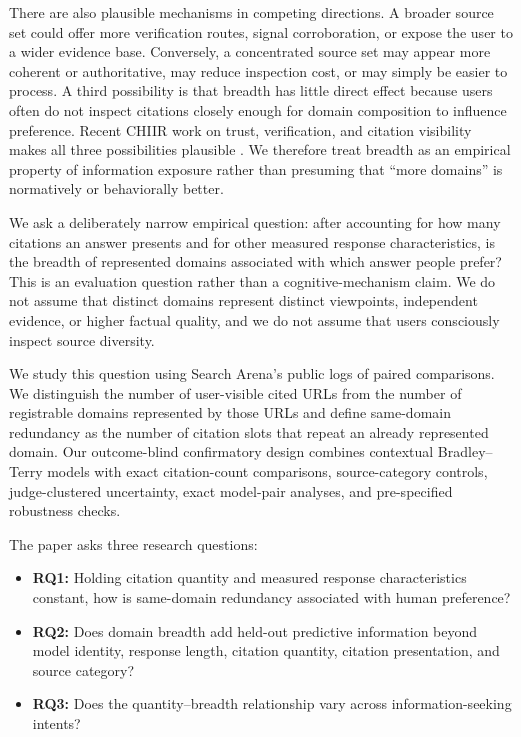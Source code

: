 \documentclass[sigconf,natbib=true,anonymous=true]{acmart}
\begin{document}
There are also plausible mechanisms in competing directions. A broader source set could offer more verification routes, signal corroboration, or expose the user to a wider evidence base. Conversely, a concentrated source set may appear more coherent or authoritative, may reduce inspection cost, or may simply be easier to process. A third possibility is that breadth has little direct effect because users often do not inspect citations closely enough for domain composition to influence preference. Recent CHIIR work on trust, verification, and citation visibility makes all three possibilities plausible \citep{mayerhofer2025blending,bink2026canyoutellme,he2026transparency}. We therefore treat breadth as an empirical property of information exposure rather than presuming that ``more domains'' is normatively or behaviorally better.

We ask a deliberately narrow empirical question: after accounting for how many citations an answer presents and for other measured response characteristics, is the breadth of represented domains associated with which answer people prefer? This is an evaluation question rather than a cognitive-mechanism claim. We do not assume that distinct domains represent distinct viewpoints, independent evidence, or higher factual quality, and we do not assume that users consciously inspect source diversity.

We study this question using Search Arena's public logs of paired comparisons. We distinguish the number of user-visible cited URLs from the number of registrable domains represented by those URLs and define same-domain redundancy as the number of citation slots that repeat an already represented domain. Our outcome-blind confirmatory design combines contextual Bradley--Terry models with exact citation-count comparisons, source-category controls, judge-clustered uncertainty, exact model-pair analyses, and pre-specified robustness checks.

The paper asks three research questions:
\begin{itemize}
    \item \textbf{RQ1:} Holding citation quantity and measured response characteristics constant, how is same-domain redundancy associated with human preference?
    \item \textbf{RQ2:} Does domain breadth add held-out predictive information beyond model identity, response length, citation quantity, citation presentation, and source category?
    \item \textbf{RQ3:} Does the quantity--breadth relationship vary across information-seeking intents?
\end{itemize}
\end{document}
